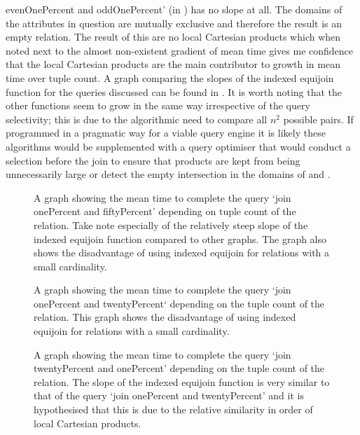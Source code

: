 evenOnePercent and oddOnePercent' (in
) has no slope at all.
The domains of the attributes in question are mutually exclusive and therefore
the result is an empty relation. The result of this are no local Cartesian
products which when noted next to the almost non-existent gradient of mean time
gives me confidence that the local Cartesian products are the main contributor
to growth in mean time over tuple count. A graph comparing the slopes of the
indexed equijoin function for the queries discussed can be found in
. It is worth noting that the other
functions seem to grow in the same way irrespective of the query selectivity;
this is due to the algorithmic need to compare all $n^2$ possible pairs. If
programmed in a pragmatic way for a viable query engine it is likely these
algorithms would be supplemented with a query optimiser that would conduct a
selection before the join to ensure that products are kept from being
unnecessarily large or detect the empty intersection in the domains of
 and .

\begin{figure}[p]
    
    \caption{A graph showing the mean time to complete the query `join
    onePercent and fiftyPercent' depending on tuple count of the relation. Take
note especially of the relatively steep slope of the indexed equijoin function
compared to other graphs. The graph also shows the disadvantage of using indexed
equijoin for relations with a small cardinality.}
    \label{fig:benchmark:onePercent-fiftyPercent-tuples}
\end{figure}

\begin{figure}[p]
    
    \caption{A graph showing the mean time to complete the query `join
    onePercent and twentyPercent` depending on the tuple count of the relation.
This graph shows the disadvantage of using indexed equijoin for relations with a
small cardinality.}
    \label{fig:benchmark:onePercent-twentyPercent-tuples}
\end{figure}

\begin{figure}[p]
    
    \caption{A graph showing the mean time to complete the query `join
    twentyPercent and onePercent' depending on the tuple count of the relation.
The slope of the indexed equijoin function is very similar to that of the query
`join onePercent and twentyPercent' and it is hypothesised that this is due to
the relative similarity in order of local Cartesian products.}
    \label{fig:benchmark:twentyPercent-onePercent-tuples}
\end{figure}

